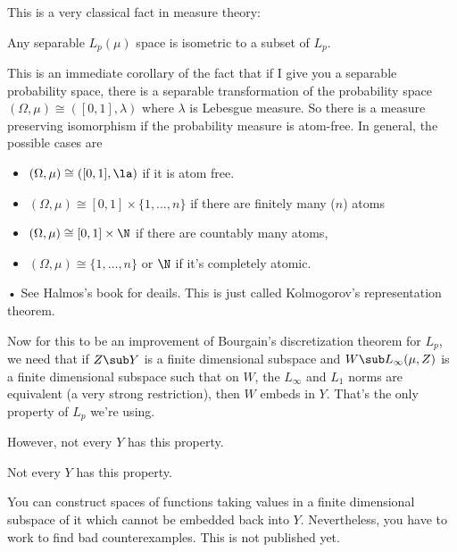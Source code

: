 This is a very classical fact in measure theory: 
\begin{thm}\label{thm:kol-rep}
Any separable $L_p(\mu)$ space is isometric to a subset of $L_p$.
\end{thm}
This is an immediate corollary of the fact that if I give you a separable probability space, there is a separable transformation of the probability space $(\Omega, \mu) \cong ([0, 1], \lambda)$ where $\lambda$ is Lebesgue measure. So there is a measure preserving isomorphism if the probability measure is atom-free.
In general, the possible cases are
\begin{itemize}
\item
$(\Omega, \mu) \cong ([0,1],\la)$ if it is atom free.
\item
$(\Omega, \mu) \cong [0,1]\times \{1,\ldots,n\}$ if there are finitely many ($n$) atoms
\item
$(\Omega, \mu) \cong [0,1]\times \N$ if there are countably many atoms,
\item
$(\Omega, \mu) \cong \{1,\ldots, n\}$ or $\N$ if it's completely atomic.
\end{itemize}•
See Halmos's book for deails. This is just called Kolmogorov's representation theorem. 

Now for this to be an improvement of Bourgain's discretization theorem for $L_p$, we need that if $Z\sub Y$ is a finite dimensional subspace and $W\sub L_{\infty}(\mu, Z)$ is a finite dimensional subspace such that on $W$, the $L_{\infty}$ and $L_1$ norms are equivalent (a very strong restriction), then $W$ embeds in $Y$. 
That's the only property of $L_p$ we're using. 


However, not every $Y$ has this property.

\begin{thm}
Not every $Y$ has this property. 
\end{thm}
You can construct spaces of functions taking values in a finite dimensional subspace of it which cannot be embedded back into $Y$. Nevertheless, you have to work to find bad counterexamples. 
This is not published yet. 

